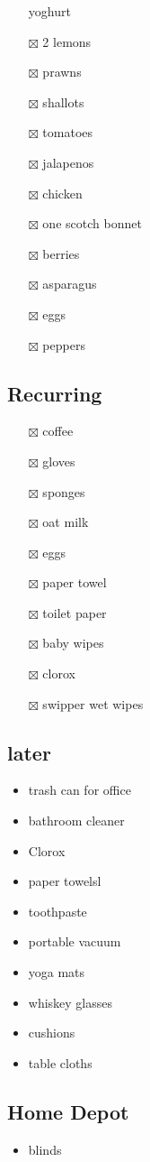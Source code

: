 \documentclass[
]{article}
\providecommand{\tightlist}{%
  \setlength{\itemsep}{0pt}\setlength{\parskip}{0pt}}
\begin{document}
\begin{itemize}
  yoghurt
\item[$\boxtimes$]
  2 lemons
\item[$\boxtimes$]
  prawns
\item[$\boxtimes$]
  shallots
\item[$\boxtimes$]
  tomatoes
\item[$\boxtimes$]
  jalapenos
\item[$\boxtimes$]
  chicken
\item[$\boxtimes$]
  one scotch bonnet
\item[$\boxtimes$]
  berries
\item[$\boxtimes$]
  asparagus
\item[$\boxtimes$]
  eggs
\item[$\boxtimes$]
  peppers
\end{itemize}

\hypertarget{recurring}{%
\subsection{Recurring}\label{recurring}}

\begin{itemize}
\tightlist
\item[$\boxtimes$]
  coffee
\item[$\boxtimes$]
  gloves
\item[$\boxtimes$]
  sponges
\item[$\boxtimes$]
  oat milk
\item[$\boxtimes$]
  eggs
\item[$\boxtimes$]
  paper towel
\item[$\boxtimes$]
  toilet paper
\item[$\boxtimes$]
  baby wipes
\item[$\boxtimes$]
  clorox
\item[$\boxtimes$]
  swipper wet wipes
\end{itemize}

\hypertarget{later}{%
\subsection{later}\label{later}}

\begin{itemize}
\tightlist
\item
  trash can for office
\item
  bathroom cleaner
\item
  Clorox
\item
  paper towelsl
\item
  toothpaste
\item
  portable vacuum
\item
  yoga mats
\item
  whiskey glasses
\item
  cushions
\item
  table cloths
\end{itemize}

\hypertarget{home-depot}{%
\subsection{Home Depot}\label{home-depot}}

\begin{itemize}
\tightlist
\item
  blinds
\end{itemize}

  

\printindex
\end{document}
